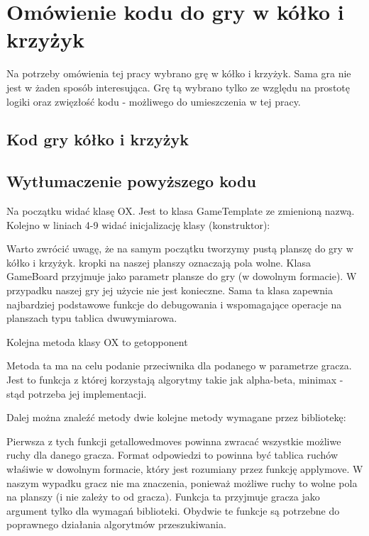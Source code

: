 \documentclass[declaration,shortabstract,inz]{iithesis}
\begin{document}
\section{Omówienie kodu do gry w kółko i krzyżyk}
Na potrzeby omówienia tej pracy wybrano grę w kółko i krzyżyk.
Sama gra nie jest w żaden sposób interesująca.
Grę tą wybrano tylko ze względu na prostotę logiki oraz zwięzłość kodu - możliwego do umieszczenia w tej pracy.
\subsection{Kod gry kółko i krzyżyk}

\subsection{Wytłumaczenie powyższego kodu}
Na początku widać klasę OX. Jest to klasa GameTemplate ze zmienioną nazwą.
Kolejno w liniach 4-9 widać inicjalizację klasy (konstruktor):

Warto zwrócić uwagę, że na samym początku tworzymy pustą planszę do gry w kółko i krzyżyk.
kropki na naszej planszy oznaczają pola wolne.
Klasa GameBoard przyjmuje jako parametr plansze do gry (w dowolnym formacie).
W przypadku naszej gry jej użycie nie jest konieczne.
Sama ta klasa zapewnia najbardziej podstawowe funkcje do debugowania i wspomagające operacje na planszach typu tablica dwuwymiarowa.

Kolejna metoda klasy OX to get\textunderscore opponent

Metoda ta ma na celu podanie przeciwnika dla podanego w parametrze gracza.
Jest to funkcja z której korzystają algorytmy takie jak alpha-beta, minimax - stąd potrzeba jej implementacji.

Dalej można znaleźć metody dwie kolejne metody wymagane przez bibliotekę:


Pierwsza z tych funkcji get\textunderscore allowed\textunderscore moves powinna zwracać wszystkie możliwe ruchy dla danego gracza.
Format odpowiedzi to powinna być tablica ruchów właśiwie w dowolnym formacie, który jest rozumiany przez funkcję apply\textunderscore move.
W naszym wypadku gracz nie ma znaczenia, ponieważ możliwe ruchy to wolne pola na planszy (i nie zależy to od gracza).
Funkcja ta przyjmuje gracza jako argument tylko dla wymagań biblioteki.
Obydwie te funkcje są potrzebne do poprawnego działania algorytmów przeszukiwania.
\end{document}
